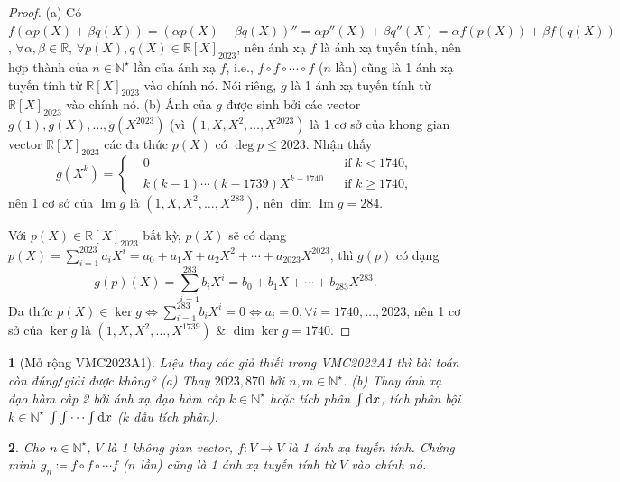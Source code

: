 \documentclass{article}
\newtheorem{baitoan}{}
\begin{document}
\begin{proof}
	(a) Có $f(\alpha p(X) + \beta q(X)) = (\alpha p(X) + \beta q(X))'' = \alpha p''(X) + \beta q''(X) = \alpha f(p(X)) + \beta f(q(X))$, $\forall\alpha,\beta\in\mathbb{R}$, $\forall p(X),q(X)\in\mathbb{R}[X]_{2023}$, nên ánh xạ $f$ là ánh xạ tuyến tính, nên hợp thành của $n\in\mathbb{N}^\star$ lần của ánh xạ $f$, i.e., $f\circ f\circ\cdots\circ f$ ($n$ lần) cũng là 1 ánh xạ tuyến tính từ $\mathbb{R}[X]_{2023}$ vào chính nó. Nói riêng, $g$ là 1 ánh xạ tuyến tính từ $\mathbb{R}[X]_{2023}$ vào chính nó. (b) Ánh của $g$ được sinh bởi các vector $g(1),g(X),\ldots,g(X^{2023})$ (vì $(1,X,X^2,\ldots,X^{2023})$ là 1 cơ sở của khong gian vector $\mathbb{R}[X]_{2023}$ các đa thức $p(X)$ có $\deg p\le2023$. Nhận thấy
	\begin{equation*}
		g(X^k) = \left\{\begin{split}
			&0&&\mbox{if } k < 1740,\\
			&k(k - 1)\cdots(k - 1739)X^{k - 1740}&&\mbox{if } k\ge1740,
		\end{split}\right.
	\end{equation*}
	nên 1 cơ sở của $\operatorname{Im}g$ là $(1,X,X^2,\ldots,X^{283})$, nên $\dim\operatorname{Im}g = 284$.
	
	Với $p(X)\in\mathbb{R}[X]_{2023}$ bất kỳ, $p(X)$ sẽ có dạng $p(X) = \sum_{i=1}^{2023} a_iX^i = a_0 + a_1X + a_2X^2 + \cdots + a_{2023}X^{2023}$, thì $g(p)$ có dạng
	\begin{equation*}
		g(p)(X) = \sum_{i=1}^{283} b_iX^i = b_0 + b_1X + \cdots + b_{283}X^{283}.
	\end{equation*}
	Đa thức $p(X)\in\operatorname{ker}g\Leftrightarrow \sum_{i=1}^{283} b_iX^i = 0\Leftrightarrow a_i = 0,\forall i = 1740,\ldots,2023$, nên 1 cơ sở của $\operatorname{ker}g$ là $(1,X,X^2,\ldots,X^{1739})$ \& $\dim\operatorname{ker}g = 1740$.
\end{proof}

\begin{baitoan}[Mở rộng VMC2023A1]
	Liệu thay các giả thiết trong VMC2023A1 thì bài toán còn đúng{\tt/}giải được không? (a) Thay $2023,870$ bởi $n,m\in\mathbb{N}^\star$. (b) Thay ánh xạ đạo hàm cấp 2 bởi ánh xạ đạo hàm cấp $k\in\mathbb{N}^\star$ hoặc tích phân $\int {\rm d}x$, tích phân bội $k\in\mathbb{N}^\star$ $\int\int\cdots\int {\rm d}x$ ($k$ dấu tích phân).
\end{baitoan}

\begin{baitoan}
	Cho $n\in\mathbb{N}^\star$, $V$ là 1 không gian vector, $f:V\to V$ là 1 ánh xạ tuyến tính. Chứng minh $g_n\coloneqq f\circ f\circ\cdots f$ ($n$ lần) cũng là 1 ánh xạ tuyến tính từ $V$ vào chính nó.
\end{baitoan}
\end{document}
